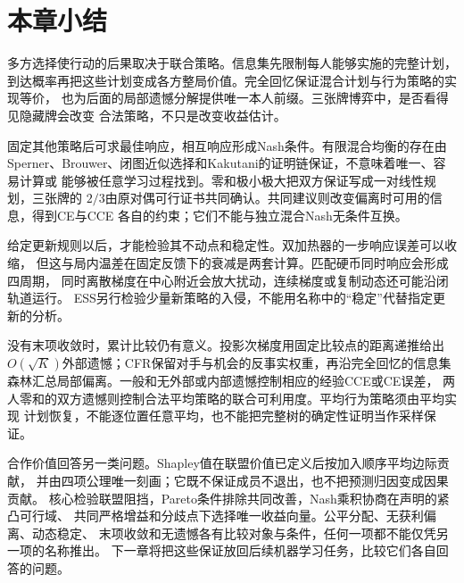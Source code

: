 \section{本章小结}
\label{sec:game-theory-and-multi-agent-decision-summary}

多方选择使行动的后果取决于联合策略。信息集先限制每人能够实施的完整计划，
到达概率再把这些计划变成各方整局价值。完全回忆保证混合计划与行为策略的实现等价，
也为后面的局部遗憾分解提供唯一本人前缀。三张牌博弈中，是否看得见隐藏牌会改变
合法策略，不只是改变收益估计。

固定其他策略后可求最佳响应，相互响应形成Nash条件。有限混合均衡的存在由
Sperner、Brouwer、闭图近似选择和Kakutani的证明链保证，不意味着唯一、容易计算或
能够被任意学习过程找到。零和极小极大把双方保证写成一对线性规划，三张牌的
\(2/3\)由原对偶可行证书共同确认。共同建议则改变偏离时可用的信息，得到CE与CCE
各自的约束；它们不能与独立混合Nash无条件互换。

给定更新规则以后，才能检验其不动点和稳定性。双加热器的一步响应误差可以收缩，
但这与局内温差在固定反馈下的衰减是两套计算。匹配硬币同时响应会形成四周期，
同时离散梯度在中心附近会放大扰动，连续梯度或复制动态还可能沿闭轨道运行。
ESS另行检验少量新策略的入侵，不能用名称中的“稳定”代替指定更新的分析。

没有末项收敛时，累计比较仍有意义。投影次梯度用固定比较点的距离递推给出
\(O(\sqrt K)\)外部遗憾；CFR保留对手与机会的反事实权重，再沿完全回忆的信息集
森林汇总局部偏离。一般和无外部或内部遗憾控制相应的经验CCE或CE误差，
两人零和的双方遗憾则控制合法平均策略的联合可利用度。平均行为策略须由平均实现
计划恢复，不能逐位置任意平均，也不能把完整树的确定性证明当作采样保证。

合作价值回答另一类问题。Shapley值在联盟价值已定义后按加入顺序平均边际贡献，
并由四项公理唯一刻画；它既不保证成员不退出，也不把预测归因变成因果贡献。
核心检验联盟阻挡，Pareto条件排除共同改善，Nash乘积协商在声明的紧凸可行域、
共同严格增益和分歧点下选择唯一收益向量。公平分配、无获利偏离、动态稳定、
末项收敛和无遗憾各有比较对象与条件，任何一项都不能仅凭另一项的名称推出。
下一章将把这些保证放回后续机器学习任务，比较它们各自回答的问题。
